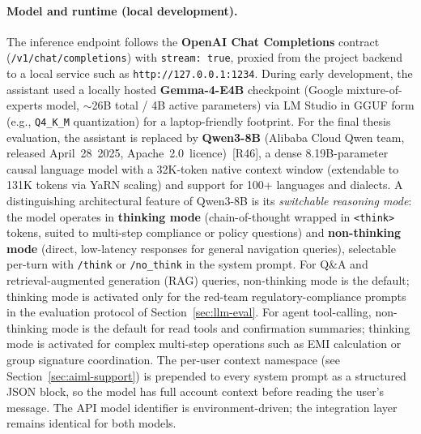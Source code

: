 \documentclass[12pt,a4paper]{report}
\begin{document}
\paragraph{Model and runtime (local development).}
The inference endpoint follows the \textbf{OpenAI Chat Completions} contract (\texttt{/v1/chat/completions}) with \texttt{stream: true}, proxied from the project backend to a local service such as \texttt{http://127.0.0.1:1234}. During early development, the assistant used a locally hosted \textbf{Gemma-4-E4B} checkpoint (Google mixture-of-experts model, $\sim$26B total / 4B active parameters) via LM Studio in GGUF form (e.g., \texttt{Q4\_K\_M} quantization) for a laptop-friendly footprint. For the final thesis evaluation, the assistant is replaced by \textbf{Qwen3-8B} (Alibaba Cloud Qwen team, released April~28~2025, Apache~2.0~licence)~[R46], a dense 8.19B-parameter causal language model with a 32K-token native context window (extendable to 131K tokens via YaRN scaling) and support for 100+ languages and dialects. A distinguishing architectural feature of Qwen3-8B is its \emph{switchable reasoning mode}: the model operates in \textbf{thinking mode} (chain-of-thought wrapped in \texttt{<think>} tokens, suited to multi-step compliance or policy questions) and \textbf{non-thinking mode} (direct, low-latency responses for general navigation queries), selectable per-turn with \texttt{/think} or \texttt{/no\_think} in the system prompt. For Q\&A and retrieval-augmented generation (RAG) queries, non-thinking mode is the default; thinking mode is activated only for the red-team regulatory-compliance prompts in the evaluation protocol of Section~\ref{sec:llm-eval}. For agent tool-calling, non-thinking mode is the default for read tools and confirmation summaries; thinking mode is activated for complex multi-step operations such as EMI calculation or group signature coordination. The per-user context namespace (see Section~\ref{sec:aiml-support}) is prepended to every system prompt as a structured JSON block, so the model has full account context before reading the user's message. The API model identifier is environment-driven; the integration layer remains identical for both models.
\end{document}
